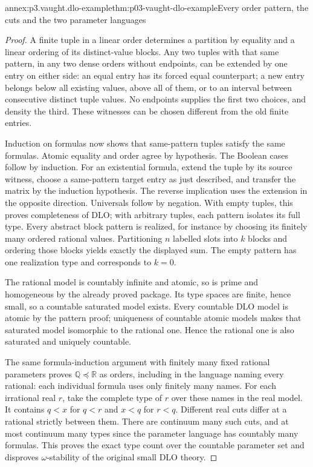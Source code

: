 \begin{annexitem}{annex:p3.vaught.dlo-example}{thm:p03-vaught-dlo-example}{Every order pattern, the cuts and the two parameter languages}
\begin{proof}
A finite tuple in a linear order determines a partition by equality
and a linear ordering of its distinct-value blocks.
Any two tuples with that same pattern, in any two dense orders
without endpoints, can be extended by one entry on either side:
an equal entry has its forced equal counterpart; a new entry belongs
below all existing values, above all of them, or to an interval
between consecutive distinct tuple values.
No endpoints supplies the first two choices, and density the third.
These witnesses can be chosen different from the old finite entries.

Induction on formulas now shows that same-pattern tuples satisfy
the same formulas. Atomic equality and order agree by hypothesis.
The Boolean cases follow by induction.
For an existential formula, extend the tuple by its source witness,
choose a same-pattern target entry as just described, and transfer
the matrix by the induction hypothesis. The reverse implication
uses the extension in the opposite direction.
Universals follow by negation. With empty tuples, this proves
completeness of DLO; with arbitrary tuples, each pattern isolates
its full type. Every abstract block pattern is realized, for instance
by choosing its finitely many ordered rational values.
Partitioning \(n\) labelled slots into \(k\) blocks and ordering those
blocks yields exactly the displayed sum. The empty pattern has
one realization type and corresponds to \(k=0\).

The rational model is countably infinite and atomic, so is prime
and homogeneous by the already proved package.
Its type spaces are finite, hence small, so a countable saturated
model exists. Every countable DLO model is atomic by the pattern
proof; uniqueness of countable atomic models makes that saturated
model isomorphic to the rational one. Hence the rational one is
also saturated and uniquely countable.

The same formula-induction argument with finitely many fixed
rational parameters proves \(\mathbb Q\preccurlyeq\mathbb R\)
as orders, including in the language naming every rational:
each individual formula uses only finitely many names.
For each irrational real \(r\), take the complete type of \(r\)
over these names in the real model.
It contains \(q<x\) for \(q<r\) and \(x<q\) for \(r<q\).
Different real cuts differ at a rational strictly between them.
There are continuum many such cuts, and at most continuum many
types since the parameter language has countably many formulas.
This proves the exact type count over the countable parameter set
and disproves \(\omega\)-stability of the original small DLO theory.


\end{proof}
\end{annexitem}
